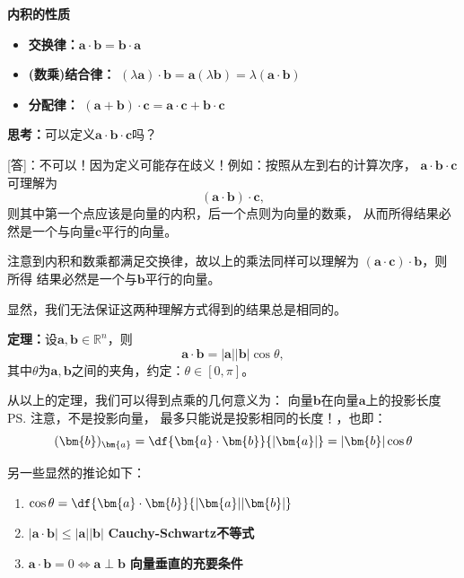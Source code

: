 \begin{thx}
	{\bf 内积的性质}
	
	\begin{itemize}
	  \item {\bf 交换律：}$\bm{a}\cdot\bm{b}=\bm{b}\cdot\bm{a}$ 
	  \item {\bf (数乘)结合律：}
	  $(\lambda\bm{a})\cdot\bm{b}=\bm{a}(\lambda\bm{b})
	  =\lambda(\bm{a}\cdot\bm{b})$  
	  \item {\bf 分配律：}  $(\bm{a}+\bm{b})\cdot\bm{c}=\bm{a}\cdot
	  \bm{c}+\bm{b}\cdot\bm{c}$ 
	\end{itemize}
\end{thx}

{\bf 思考：}可以定义$\bm{a}\cdot\bm{b}\cdot\bm{c}$吗？

[答]：不可以！因为定义可能存在歧义！例如：按照从左到右的计算次序，
$\bm{a}\cdot\bm{b}\cdot\bm{c}$可理解为
$$(\bm{a}\cdot\bm{b})\cdot\bm{c},$$
则其中第一个点应该是向量的内积，后一个点则为向量的数乘，
从而所得结果必然是一个与向量$\bm{c}$平行的向量。

注意到内积和数乘都满足交换律，故以上的乘法同样可以理解为
$(\bm{a}\cdot\bm{c})\cdot\bm{b}$，则所得
结果必然是一个与$\bm{b}$平行的向量。

显然，我们无法保证这两种理解方式得到的结果总是相同的。\fin

\begin{thx}
	{\bf 定理：}设$\bm{a},\bm{b}\in\mathbb{R}^n$，则
	$$\bm{a}\cdot\bm{b}=|\bm{a}||\bm{b}|\cos\theta,$$
	其中$\theta$为$\bm{a},\bm{b}$之间的夹角，约定：$\theta\in[0,\pi]$。
\end{thx}

从以上的定理，我们可以得到点乘的几何意义为：
{\kaishu 向量$\bm{b}$在向量$\bm{a}$上的投影长度}\ps{注意，不是投影向量，
最多只能说是投影相同的长度！}，也即：
$$(\bm{b})_{\bm{a}}=\df{\bm{a}\cdot\bm{b}}{|\bm{a}|}
=|\bm{b}|\cos\theta$$

另一些显然的推论如下：
\begin{thx}
	\begin{enumerate}%
	  \item $\cos\theta=\df{\bm{a}\cdot\bm{b}}{|\bm{a}||\bm{b}|}$
	  \item $|\bm{a}\cdot\bm{b}|\leq|\bm{a}||\bm{b}|$
	  \hfill{\bf Cauchy-Schwartz不等式}
	  \item $\bm{a}\cdot\bm{b}=0\Leftrightarrow\bm{a}\perp\bm{b}$
	  \hfill {\bf 向量垂直的充要条件}
	\end{enumerate}
\end{thx}

